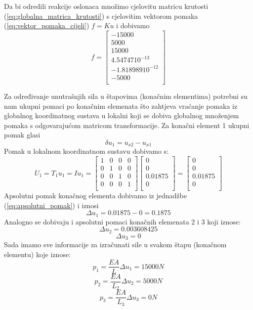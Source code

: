 \documentclass[a4paper,twoside,12pt]{memoir} %
\begin{document}
Da bi odredili reakcije oslonaca množimo cjelovitu matricu krutosti (\ref{eq:globalna_matrica_krutosti}) s cjelovitim vektorom pomaka (\ref{eq:vektor_pomaka_cijeli}) $f = K  u$ i dobivamo
\begin{equation}
\label{eq:reakcije_oslonaca}
    f =
    \begin{bmatrix}
    -15000 \\ 
    5000 \\ 
    15000 \\ 
    4.54747  10^{-13} \\ 
    -1.818989  10^{-12} \\ 
    -5000 \\
    \end{bmatrix}
\end{equation}

Za određivanje unutrašnjih sila u štapovima (konačnim elementima) potrebni su nam ukupni pomaci po konačnim elemenata što zahtjeva vraćanje pomaka iz globalnog koordinatnog sustava u lokalni koji se dobiva globalnog množenjem pomaka s odgovarajućom matricom transformacije. Za konačni element 1 ukupni pomak glasi 
\begin{equation}
\label{eq:apsolutni_pomak}
\delta u_1 = u_{x2} - u_{x1}
\end{equation}
Pomak u lokalnom koordinatnom sustavu dobivamo s:
\begin{equation}
\label{eq:transformacija_u_lokalni}
    U_1 = T_1  u_1 = I  u_1 =
    \begin{bmatrix}
    1 & 0 & 0 & 0 \\
    0 & 1 & 0 & 0 \\
    0 & 0 & 1 & 0 \\
    0 & 0 & 0 & 1 \\
    \end{bmatrix} 
    \begin{bmatrix}
    0 \\ 0 \\ 0.01875 \\ 0 \\
    \end{bmatrix}
    = 
    \begin{bmatrix}
    0 \\ 0 \\ 0.01875 \\ 0 \\
    \end{bmatrix}
\end{equation}
Apsolutni pomak konačnog elementa dobivamo iz jednadžbe (\ref{eq:apsolutni_pomak}) i iznosi $$\Delta u_1 = 0.01875 - 0 = 0.1875 $$
Analogno se dobivaju i apsolutni pomaci konačnih elemenata 2 i 3 koji iznose: 
$$\Delta u_2 = 0.003608425$$
$$\Delta u_3 = 0$$
Sada imamo sve informacije za izračunati sile u svakom štapu (konačnom elementu) koje iznose:
$$p_1 = \frac{E  A}{L}  \Delta u_1 = 15000 N$$
$$p_2 = \frac{E  A}{L_2}  \Delta u_2 = 5000 N$$
$$p_3 = \frac{E  A}{L_3}  \Delta u_3 = 0 N $$
\end{document}

